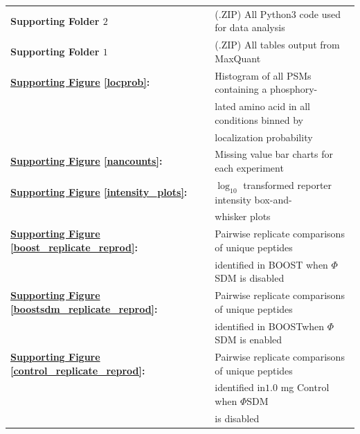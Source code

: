 \documentclass[journal=jprobs,manuscript=article]{achemso}
\begin{document}
\begin{table}[h!]
\begin{tabular}{ll}
	\textbf{Supporting Folder $2$} & (.ZIP) All Python3 code used for data analysis \\

	\textbf{Supporting Folder $1$} & (.ZIP) All tables output from MaxQuant \\

        \textbf{\hyperref[locprob]{Supporting Figure} \ref{locprob}:} & Histogram of all PSMs containing a phosphory- \\
                                                                                                                & lated amino acid in all conditions binned by \\
                                                                                                                & localization probability \\

       \textbf{\hyperref[nancounts]{Supporting Figure} \ref{nancounts}:} & Missing value bar charts for each experiment \\

        \textbf{\hyperref[intensity_plots]{Supporting Figure} \ref{intensity_plots}:} & $\log_{10}$ transformed reporter intensity box-and- \\
                                                                                                                                   & whisker plots \\
        
        \textbf{\hyperref[boost_replicate_reprod]{Supporting Figure} \ref{boost_replicate_reprod}:} & Pairwise replicate comparisons of unique peptides  \\
                                                                                                                                                                    &  identified in BOOST when $\Phi$SDM is disabled \\

        \textbf{\hyperref[boostsdm_replicate_reprod]{Supporting Figure} \ref{boostsdm_replicate_reprod}:} & Pairwise replicate comparisons of unique peptides  \\
                                                                                                                                                                    &  identified in BOOSTwhen $\Phi$SDM is enabled \\

        \textbf{\hyperref[control_replicate_reprod]{Supporting Figure} \ref{control_replicate_reprod}:} & Pairwise replicate comparisons of unique peptides  \\
                                                                                                                                                                    &  identified in$1.0$ mg Control when $\Phi$SDM\\
                                                                                                                                                                    &  is disabled \\


\end{tabular}
\end{table}
\end{document}
